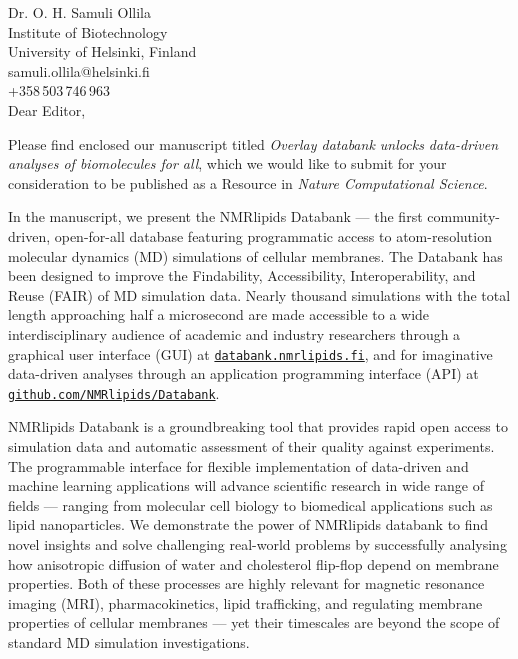 \documentclass[11pt]{letter}
\begin{document}
\reversemarginpar
\pagestyle{empty}
\noindent Dr. O. H. Samuli Ollila \\
\noindent Institute of Biotechnology \\
\noindent University of Helsinki, Finland \\
\noindent samuli.ollila@helsinki.fi\\
\noindent +358\,503\,746\,963 \\


Dear Editor,

Please find enclosed our manuscript titled
{\it Overlay databank unlocks data-driven analyses of biomolecules for all}, which we would like to submit for your consideration to be published as a Resource in \textit{ Nature Computational Science}.

In the manuscript, we present the NMRlipids Databank --- the first community-driven, open-for-all database featuring programmatic access to atom-resolution molecular dynamics (MD) simulations of cellular membranes. The Databank has been designed to improve the Findability, Accessibility, Interoperability, and Reuse (FAIR) of MD simulation data. Nearly thousand simulations with the total length approaching half a microsecond are made accessible to a wide interdisciplinary audience of academic and industry researchers through a graphical user interface (GUI) at \href{https://databank.nmrlipids.fi/}{\tt databank.nmrlipids.fi}, and for imaginative data-driven analyses through an application programming interface (API) at \href{https://github.com/NMRlipids/Databank}{\tt github.com/NMRlipids/Databank}.

NMRlipids Databank is a groundbreaking tool that provides rapid open access to simulation data and automatic assessment of their quality against experiments. The programmable interface for flexible implementation of data-driven and machine learning applications will advance scientific research in wide range of fields
--- ranging from molecular cell biology to biomedical applications such as lipid nanoparticles. 
We demonstrate the power of NMRlipids databank to find novel insights and solve challenging real-world problems
by successfully analysing how anisotropic diffusion of water and cholesterol flip-flop depend on membrane properties. Both of these processes are highly relevant for magnetic resonance imaging (MRI), pharmacokinetics, lipid trafficking, and regulating membrane properties of cellular membranes --- yet their timescales are beyond the scope of standard MD simulation investigations. 
\end{document}
